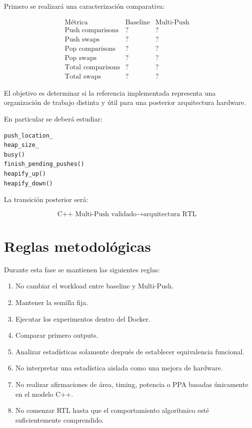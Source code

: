 \documentclass[11pt,a4paper]{article}
\begin{document}
Primero se realizará una caracterización comparativa:

\[
\begin{array}{c|c|c}
\text{Métrica} & \text{Baseline} & \text{Multi-Push}\\
\hline
\text{Push comparisons} & ? & ?\\
\text{Push swaps} & ? & ?\\
\text{Pop comparisons} & ? & ?\\
\text{Pop swaps} & ? & ?\\
\text{Total comparisons} & ? & ?\\
\text{Total swaps} & ? & ?
\end{array}
\]

El objetivo es determinar si la referencia implementada representa una
organización de trabajo distinta y útil para una posterior arquitectura
hardware.

En particular se deberá estudiar:

\begin{lstlisting}[style=textfile]
push_location_
heap_size_
busy()
finish_pending_pushes()
heapify_up()
heapify_down()
\end{lstlisting}

La transición posterior será:

\[
\boxed{
\text{C++ Multi-Push validado}
\rightarrow
\text{arquitectura RTL}
}
\]

\section{Reglas metodológicas}

Durante esta fase se mantienen las siguientes reglas:

\begin{enumerate}
    \item No cambiar el workload entre baseline y Multi-Push.
    \item Mantener la semilla fija.
    \item Ejecutar los experimentos dentro del Docker.
    \item Comparar primero outputs.
    \item Analizar estadísticas solamente después de establecer
    equivalencia funcional.
    \item No interpretar una estadística aislada como una mejora de
    hardware.
    \item No realizar afirmaciones de área, timing, potencia o PPA
    basadas únicamente en el modelo C++.
    \item No comenzar RTL hasta que el comportamiento algorítmico esté
    suficientemente comprendido.
\end{enumerate}
\end{document}
